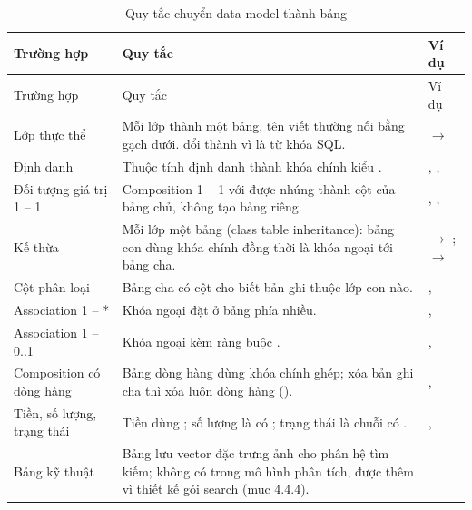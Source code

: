 \documentclass[12pt,a4paper]{article}
\begin{document}
\begin{longtable}{@{}P{3.5cm}P{6.6cm}P{5.8cm}@{}}
\caption{Quy tắc chuyển data model thành bảng}\label{tab:mapping}\\
\toprule
Trường hợp & Quy tắc & Ví dụ\\
\midrule
\endfirsthead
\toprule
Trường hợp & Quy tắc & Ví dụ\\
\midrule
\endhead
\small Lớp thực thể & \small Mỗi lớp thành một bảng, tên viết thường nối bằng gạch dưới.  đổi thành  vì  là từ khóa SQL. & \small {} $\to$ \\
\small Định danh & \small Thuộc tính định danh thành khóa chính kiểu . & \small {}, , \\
\small Đối tượng giá trị 1 -- 1 & \small Composition 1 -- 1 với  được nhúng thành cột của bảng chủ, không tạo bảng riêng. & \small {}, , \\
\small Kế thừa & \small Mỗi lớp một bảng (class table inheritance): bảng con dùng khóa chính đồng thời là khóa ngoại tới bảng cha. & \small {} $\to$ ;  $\to$ \\
\small Cột phân loại & \small Bảng cha có cột cho biết bản ghi thuộc lớp con nào. & \small {}, \\
\small Association 1 -- * & \small Khóa ngoại đặt ở bảng phía nhiều. & \small {}, \\
\small Association 1 -- 0..1 & \small Khóa ngoại kèm ràng buộc . & \small {}, \\
\small Composition có dòng hàng & \small Bảng dòng hàng dùng khóa chính ghép; xóa bản ghi cha thì xóa luôn dòng hàng (). & \small {}, \\
\small Tiền, số lượng, trạng thái & \small Tiền dùng ; số lượng là  có ; trạng thái là chuỗi có . & \small {}, \\
\small Bảng kỹ thuật & \small Bảng  lưu vector đặc trưng ảnh cho phân hệ tìm kiếm; không có trong mô hình phân tích, được thêm vì thiết kế gói search (mục 4.4.4). & \small {}\\
\bottomrule
\end{longtable}
\end{document}
